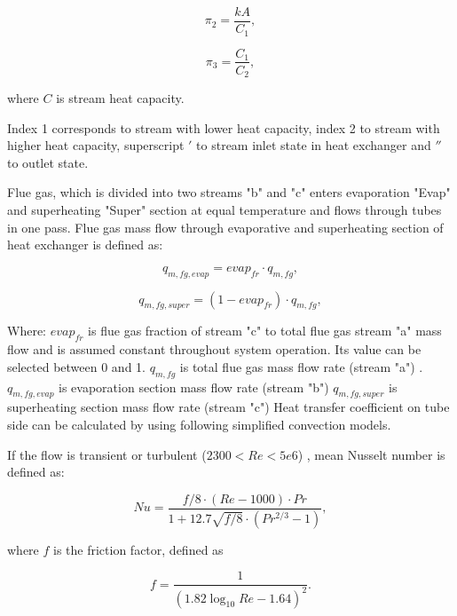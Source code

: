 \documentclass[openany]{book}
\begin{document}
	\begin{equation}\label{eq:pi_params2}
	\pi_2 = \frac{kA}{C_1},
	\end{equation}
	
	\begin{equation}\label{eq:pi_params3}
	\pi_3 = \frac{C_1}{C_2},
	\end{equation}
	
	\noindent
	where $C$ is stream heat capacity.
	
	Index 1 corresponds to stream with lower heat capacity, index 2 to stream 
	with higher heat capacity, superscript $'$ to stream inlet state in heat 
	exchanger and $''$ to outlet state.
	
	Flue gas, which is divided into two streams "b" and "c" enters evaporation 
	"Evap" and superheating "Super" section at equal temperature and flows 
	through tubes in one pass. Flue gas mass flow through evaporative and 
	superheating section of heat exchanger is defined as:
	
	\begin{equation}\label{eq:flue_gas_flow1}
	q_{m,fg,evap} = evap_{fr} \cdot q_{m,fg},
	\end{equation}
	
	\begin{equation}\label{eq:flue_gas_flow2}
	q_{m,fg,super} = (1-evap_{fr}) \cdot q_{m,fg},
	\end{equation}
	
	\noindent
	Where:
	$evap_{fr}$ is flue gas fraction of stream "c" to total flue gas stream 
	"a" mass flow and is assumed constant throughout system 
	operation. Its value can be selected between 0 and 1.
	$q_{m,fg}$ is total flue gas mass flow rate (stream "a") .
	$q_{m,fg,evap}$ is evaporation section mass flow rate (stream "b")
	$q_{m,fg,super}$ is superheating section mass flow rate (stream "c")
	Heat transfer coefficient on tube side can be calculated by using following 
	simplified convection models.
	
	\noindent
	If the flow is transient or turbulent ($2300 < Re < 5e6$) , mean Nusselt 
	number is defined as:
	
	\begin{equation}\label{eq:nusselt}
	Nu = \frac{f/8 \cdot (Re - 1000) \cdot Pr}{1+12.7\sqrt{f/8} \cdot 
	(Pr^{2/3}-1)},
	\end{equation}
	
	\noindent
	where $f$ is the friction factor, defined as
	
	\begin{equation}\label{eq:fric_factor}
	f = \frac{1}{(1.82\log_{10}Re - 1.64)^2}.
	\end{equation}
	
\end{document}

